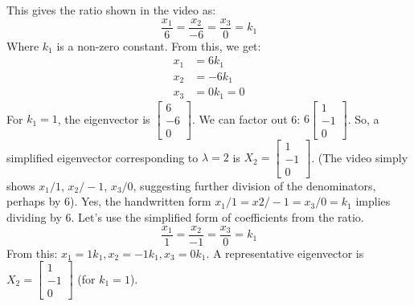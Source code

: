 \documentclass{article}
\begin{document}
This gives the ratio shown in the video as:
\[ \frac{x_1}{6} = \frac{x_2}{-6} = \frac{x_3}{0} = k_1 \]
Where $k_1$ is a non-zero constant.
From this, we get:
\begin{align*} x_1 &= 6k_1 \\ x_2 &= -6k_1 \\ x_3 &= 0k_1 = 0 \end{align*}
For $k_1=1$, the eigenvector is $\begin{bmatrix} 6 \\ -6 \\ 0 \end{bmatrix}$. We can factor out 6: $6 \begin{bmatrix} 1 \\ -1 \\ 0 \end{bmatrix}$.
So, a simplified eigenvector corresponding to $\lambda = 2$ is $X_2 = \begin{bmatrix} 1 \\ -1 \\ 0 \end{bmatrix}$. (The video simply shows $x_1/1$, $x_2/-1$, $x_3/0$, suggesting further division of the denominators, perhaps by 6). Yes, the handwritten form $x_1/1 = x2/-1 = x_3/0 = k_1$ implies dividing by 6. Let's use the simplified form of coefficients from the ratio.
\[ \frac{x_1}{1} = \frac{x_2}{-1} = \frac{x_3}{0} = k_1 \]
From this: $x_1 = 1k_1, x_2 = -1k_1, x_3 = 0k_1$. A representative eigenvector is $X_2 = \begin{bmatrix} 1 \\ -1 \\ 0 \end{bmatrix}$ (for $k_1=1$).
\end{document}
